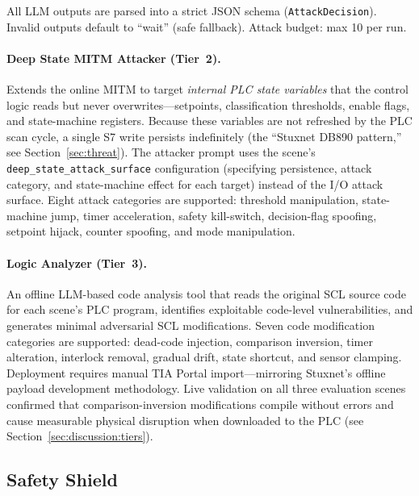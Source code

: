 All LLM outputs are parsed into a strict JSON schema (\texttt{AttackDecision}). Invalid outputs default to ``wait'' (safe fallback). Attack budget: max 10 per run.

\paragraph{Deep State MITM Attacker (Tier~2).} Extends the online MITM to target \emph{internal PLC state variables} that the control logic reads but never overwrites---setpoints, classification thresholds, enable flags, and state-machine registers. Because these variables are not refreshed by the PLC scan cycle, a single S7 write persists indefinitely (the ``Stuxnet DB890 pattern,'' see Section~\ref{sec:threat}). The attacker prompt uses the scene's \texttt{deep\_state\_attack\_surface} configuration (specifying persistence, attack category, and state-machine effect for each target) instead of the I/O attack surface.  Eight attack categories are supported: threshold manipulation, state-machine jump, timer acceleration, safety kill-switch, decision-flag spoofing, setpoint hijack, counter spoofing, and mode manipulation.

\paragraph{Logic Analyzer (Tier~3).} An offline LLM-based code analysis tool that reads the original SCL source code for each scene's PLC program, identifies exploitable code-level vulnerabilities, and generates minimal adversarial SCL modifications.  Seven code modification categories are supported: dead-code injection, comparison inversion, timer alteration, interlock removal, gradual drift, state shortcut, and sensor clamping.  Deployment requires manual TIA Portal import---mirroring Stuxnet's offline payload development methodology.  Live validation on all three evaluation scenes confirmed that comparison-inversion modifications compile without errors and cause measurable physical disruption when downloaded to the PLC (see Section~\ref{sec:discussion:tiers}).

\subsection{Safety Shield}

